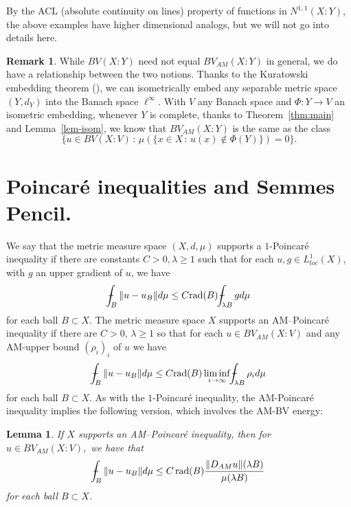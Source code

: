 \documentclass[11pt, letterpaper]{amsart} %
\providecommand*{\vint}[1]{\mathchoice
          {\mathop{\vrule width 5pt height 3 pt depth -2.5pt
                  \kern -9pt \kern 1pt\intop}\nolimits_{\kern -5pt{#1}}}
          {\mathop{\vrule width 5pt height 3 pt depth -2.6pt
                  \kern -6pt \intop}\nolimits_{\kern -3pt{#1}}}
          {\mathop{\vrule width 5pt height 3 pt depth -2.6pt
                  \kern -6pt \intop}\nolimits_{\kern -3pt{#1}}}
          {\mathop{\vrule width 5pt height 3 pt depth -2.6pt
                  \kern -6pt \intop}\nolimits_{\kern -3pt{#1}}}}
\DeclareMathOperator{\rad}{rad}
\numberwithin{equation}{section}
\theoremstyle{plain}
\newtheorem{lemma}[equation]{Lemma}
\theoremstyle{definition}
\newtheorem{remark}[equation]{Remark}
\begin{document}
{By the ACL (absolute continuity on lines) property of functions in $N^{1,1}(X:Y)$, the above examples have higher
dimensional analogs, but we will not go into details here.

\begin{remark}
While $BV(X:Y)$ need not equal $BV_{AM}(X:Y)$ in general, we do have a relationship between the two notions. 
Thanks to the Kuratowski embedding theorem (\cite[page~100]{HKSTbook}), 
we can isometrically embed any separable metric space $(Y,d_Y)$ into
the Banach space $\ell^\infty$. With $V$ any Banach space and $\Phi:Y\to V$ an isometric embedding, whenever
$Y$ is complete, thanks to Theorem~\ref{thm:main} and Lemma~\ref{lem-isom}, we know that $BV_{AM}(X:Y)$ is 
the same as the class
\[
\Bigg\lbrace u\in BV(X:V)\, :\, \mu(\{x\in X\, :\, u(x)\not\in \Phi(Y)\})=0\Bigg\rbrace.
\]
\end{remark}





\section{Poincaré inequalities and Semmes Pencil.}\label{Sec:3}
We say that the metric measure space $(X,d,\mu)$ supports a $1$-Poincaré inequality if there are 
constants $C>0,\lambda \geq 1$ such that for each 
$u,g\in L^1_{loc}(X)$, with $g$ an upper gradient of $u$, we have
\[
\vint{B}\Vert u-u_B\Vert d\mu\leq C\mathrm{rad}(B)\vint{\lambda B}gd\mu 
\]
for each ball $B\subset X$.  The metric measure space $X$ supports an AM--Poincaré inequality if there are
$C>0,\,\lambda\geq 1$ so that for each $u\in BV_{AM}(X:V)$ and any AM-upper bound $(\rho_i)_i$ of $u$ we have
\[
\vint{B}\Vert u-u_B\Vert d\mu\leq C\mathrm{rad}(B)\liminf_{i\to\infty }\vint{\lambda B}\rho_i d\mu 
\]
for each ball $B\subset X$.  As with the $1$-Poincar\'e inequality, the AM-Poincar\'e inequality 
implies the following version, which involves the AM-BV energy:

\begin{lemma}\label{eq:PI-BV-AM}
If $X$ supports an AM--Poincar\'e inequality, then for $u\in BV_{AM}(X:V),$ we have that 
\[
\vint{B}\|u-u_B\|d\mu\le C\rad(B)\frac{\|D_{AM}u\|(\lambda B)}{\mu(\lambda B)}
\]
for each ball $B\subset X$.
\end{lemma}

}
\end{document}
